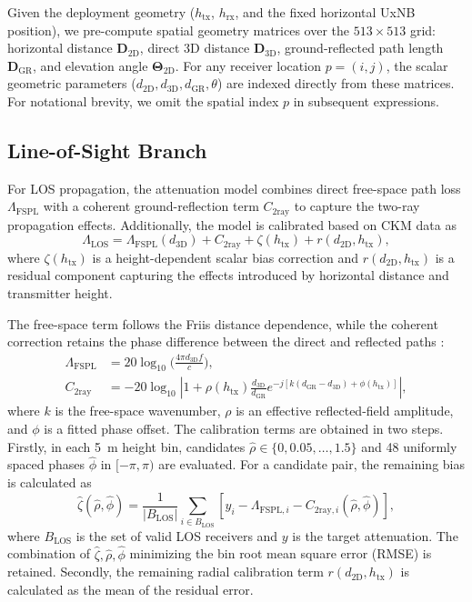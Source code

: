 \documentclass[10pt,conference,letterpaper]{IEEEtran}
\begin{document}
Given the deployment geometry ($h_{\text{tx}}$, $h_{\text{rx}}$, and the fixed horizontal UxNB position), we pre-compute spatial geometry matrices over the $513 \times 513$ grid: horizontal distance $\mathbf{D}_{\text{2D}}$, direct 3D distance $\mathbf{D}_{\text{3D}}$, ground-reflected path length $\mathbf{D}_{\text{GR}}$, and elevation angle $\mathbf{\Theta}_{\text{2D}}$. For any receiver location $p = (i, j)$, the scalar geometric parameters ($d_{\text{2D}}, d_{\text{3D}}, d_{\text{GR}}, \theta$) are indexed directly from these matrices. For notational brevity, we omit the spatial index $p$ in subsequent expressions.

\subsection{Line-of-Sight Branch}
\label{sec:los}
For LOS propagation, the attenuation model combines direct free-space path loss
$\Lambda_\text{FSPL}$ with a coherent ground-reflection term
$C_{\text{2ray}}$ to capture the two-ray propagation effects. Additionally,
the model is calibrated based on CKM data as
\begin{equation}
\Lambda_{\mathrm{LOS}} = \Lambda_\text{FSPL}(d_{\text{3D}}) + C_{\text{2ray}} + \zeta(h_{\text{tx}}) + r(d_{\text{2D}},h_{\text{tx}}),
\label{eq:pl_los}
\end{equation}
where $\zeta(h_{\text{tx}})$ is a height-dependent scalar bias correction and $r(d_{\text{2D}},h_{\text{tx}})$ is a residual component capturing the effects introduced by horizontal distance and transmitter height.

The free-space term follows the Friis distance dependence, while the coherent
correction retains the phase difference between the direct and reflected paths
\cite{rappaport}:
\begin{align}
\Lambda_\text{FSPL}&=20\log_{10}\Big(\frac{4\pi d_\text{3D} f}{c}\Big),\label{eq:fspl}\\
C_{\mathrm{2ray}}&=-20\log_{10}\left|1+\rho(h_{\mathrm{tx}})
\frac{d_{\mathrm{3D}}}{d_{\mathrm{GR}}}
e^{-j[k(d_{\mathrm{GR}}-d_{\mathrm{3D}})+\phi(h_{\mathrm{tx}})]}\right|,
\label{eq:tworay}
\end{align}
where $k$ is the free-space wavenumber, $\rho$ is an effective reflected-field amplitude, and $\phi$ is a fitted phase offset. The calibration terms are obtained in two steps.
Firstly, in each \SI{5}{m} height bin, candidates $\hat\rho\in\{0,0.05,\ldots,1.5\}$ and 48 uniformly spaced phases $\hat{\phi}$ in $[-\pi,\pi)$ are evaluated. For a candidate pair, the remaining bias is calculated as
\begin{equation}
\hat\zeta(\hat\rho,\hat\phi)=\frac{1}{|B_\text{LOS}|}\sum_{i\in B_\text{LOS}}
\left[y_i-\Lambda_{\text{FSPL},i}-C_{\mathrm{2ray},i}(\hat\rho,\hat\phi)\right],
\label{eq:los-fit}
\end{equation}
where $B_\text{LOS}$ is the set of valid LOS receivers and $y$ is the target attenuation. The combination of $\hat\zeta,\hat\rho,\hat\phi$ minimizing the bin root mean square error (RMSE) is retained.
Secondly, the remaining radial calibration term $r(d_{\text{2D}},h_\text{tx})$ is calculated as the mean of the residual error.
\end{document}
